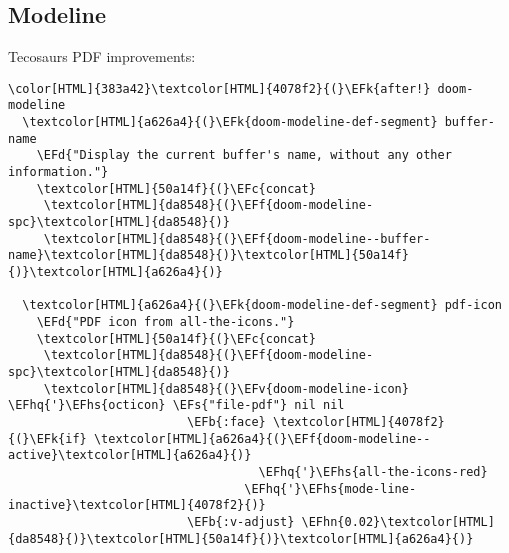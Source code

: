 \documentclass{scrartcl}
\newcommand{\EFk}[1]{\textcolor{EFk}{#1}} %
\newcommand{\EFd}[1]{\textcolor{EFd}{\textit{#1}}} %
\newcommand{\EFs}[1]{\textcolor{EFs}{#1}} %
\newcommand{\EFb}[1]{\textcolor{EFb}{#1}} %
\newcommand{\EFc}[1]{\textcolor{EFc}{#1}} %
\newcommand{\EFv}[1]{\textcolor{EFv}{#1}} %
\newcommand{\EFf}[1]{\textcolor{EFf}{#1}} %
\newcommand{\EFhn}[1]{\textcolor{EFhn}{\textbf{#1}}} %
\newcommand{\EFhq}[1]{\textcolor{EFhq}{#1}} %
\newcommand{\EFhs}[1]{\textcolor{EFhs}{#1}} %
\begin{document}
\subsection{Modeline}
\label{sec:org3344660}
Tecosaurs PDF improvements:
\begin{Code}
\begin{Verbatim}[]
\color[HTML]{383a42}\textcolor[HTML]{4078f2}{(}\EFk{after!} doom-modeline
  \textcolor[HTML]{a626a4}{(}\EFk{doom-modeline-def-segment} buffer-name
    \EFd{"Display the current buffer's name, without any other information."}
    \textcolor[HTML]{50a14f}{(}\EFc{concat}
     \textcolor[HTML]{da8548}{(}\EFf{doom-modeline-spc}\textcolor[HTML]{da8548}{)}
     \textcolor[HTML]{da8548}{(}\EFf{doom-modeline--buffer-name}\textcolor[HTML]{da8548}{)}\textcolor[HTML]{50a14f}{)}\textcolor[HTML]{a626a4}{)}

  \textcolor[HTML]{a626a4}{(}\EFk{doom-modeline-def-segment} pdf-icon
    \EFd{"PDF icon from all-the-icons."}
    \textcolor[HTML]{50a14f}{(}\EFc{concat}
     \textcolor[HTML]{da8548}{(}\EFf{doom-modeline-spc}\textcolor[HTML]{da8548}{)}
     \textcolor[HTML]{da8548}{(}\EFv{doom-modeline-icon} \EFhq{'}\EFhs{octicon} \EFs{"file-pdf"} nil nil
                         \EFb{:face} \textcolor[HTML]{4078f2}{(}\EFk{if} \textcolor[HTML]{a626a4}{(}\EFf{doom-modeline--active}\textcolor[HTML]{a626a4}{)}
                                   \EFhq{'}\EFhs{all-the-icons-red}
                                 \EFhq{'}\EFhs{mode-line-inactive}\textcolor[HTML]{4078f2}{)}
                         \EFb{:v-adjust} \EFhn{0.02}\textcolor[HTML]{da8548}{)}\textcolor[HTML]{50a14f}{)}\textcolor[HTML]{a626a4}{)}


\end{Verbatim}
\end{Code}
\end{document}
